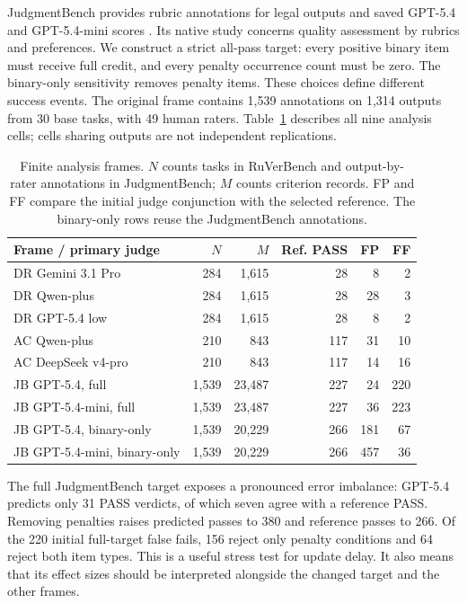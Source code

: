 \documentclass[10pt,letterpaper]{article}
\begin{document}
JudgmentBench provides rubric annotations for legal outputs and saved GPT-5.4 and GPT-5.4-mini scores \citep{yang2026judgmentbench}. Its native study concerns quality assessment by rubrics and preferences. We construct a strict all-pass target: every positive binary item must receive full credit, and every penalty occurrence count must be zero. The binary-only sensitivity removes penalty items. These choices define different success events. The original frame contains 1,539 annotations on 1,314 outputs from 30 base tasks, with 49 human raters. Table~\ref{tab:data} describes all nine analysis cells; cells sharing outputs are not independent replications.

\begin{table}[t]
\centering\small
\caption{Finite analysis frames. $N$ counts tasks in RuVerBench and output-by-rater annotations in JudgmentBench; $M$ counts criterion records. FP and FF compare the initial judge conjunction with the selected reference. The binary-only rows reuse the JudgmentBench annotations.}
\label{tab:data}
\begin{tabular}{lrrrrr}
\toprule
Frame / primary judge & $N$ & $M$ & Ref. PASS & FP & FF\\
\midrule
DR Gemini 3.1 Pro & 284 & 1,615 & 28 & 8 & 2\\
DR Qwen-plus & 284 & 1,615 & 28 & 28 & 3\\
DR GPT-5.4 low & 284 & 1,615 & 28 & 8 & 2\\
AC Qwen-plus & 210 & 843 & 117 & 31 & 10\\
AC DeepSeek v4-pro & 210 & 843 & 117 & 14 & 16\\
JB GPT-5.4, full & 1,539 & 23,487 & 227 & 24 & 220\\
JB GPT-5.4-mini, full & 1,539 & 23,487 & 227 & 36 & 223\\
JB GPT-5.4, binary-only & 1,539 & 20,229 & 266 & 181 & 67\\
JB GPT-5.4-mini, binary-only & 1,539 & 20,229 & 266 & 457 & 36\\
\bottomrule
\end{tabular}
\end{table}

The full JudgmentBench target exposes a pronounced error imbalance: GPT-5.4 predicts only 31 PASS verdicts, of which seven agree with a reference PASS. Removing penalties raises predicted passes to 380 and reference passes to 266. Of the 220 initial full-target false fails, 156 reject only penalty conditions and 64 reject both item types. This is a useful stress test for update delay. It also means that its effect sizes should be interpreted alongside the changed target and the other frames.
\end{document}

